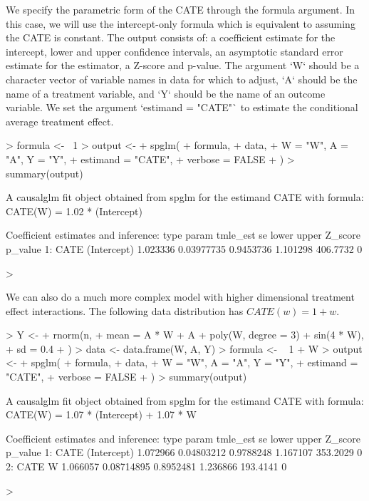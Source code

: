 \documentclass[article]{jss}
\begin{document}
We specify the parametric form of the CATE through the formula argument. In this case, we will use the intercept-only formula which is equivalent to assuming the CATE is constant.  The output consists of:
a coefficient estimate for the intercept, lower and upper confidence intervals, an asymptotic standard error estimate for the estimator, a Z-score and p-value. The argument `W` should be a character vector of variable names in data for which to adjust, `A` should be the name of a treatment variable, and `Y` should be the name of an outcome variable. We set the argument `estimand = "CATE"` to estimate the conditional average treatment effect.
\begin{Schunk}
\begin{Sinput}
> formula <- ~1
> output <-
+   spglm(
+     formula,
+     data,
+     W = "W", A = "A", Y = "Y",
+     estimand = "CATE",
+     verbose = FALSE
+   )
> summary(output)
\end{Sinput}
\begin{Soutput}
A causalglm fit object obtained from spglm for the estimand CATE with formula: 
CATE(W) = 1.02 * (Intercept)

Coefficient estimates and inference:
   type       param tmle_est         se     lower    upper  Z_score p_value
1: CATE (Intercept) 1.023336 0.03977735 0.9453736 1.101298 406.7732       0
\end{Soutput}
\begin{Sinput}
> 
\end{Sinput}
\end{Schunk}
We can also do a much more complex model with higher dimensional treatment effect interactions. The following data distribution has $CATE(w) = 1 + w$.  
\begin{Schunk}
\begin{Sinput}
> Y <-
+   rnorm(n,
+     mean = A * W + A + poly(W, degree = 3) + sin(4 * W),
+     sd = 0.4
+   )
> data <- data.frame(W, A, Y)
> formula <- ~ 1 + W
> output <-
+   spglm(
+     formula,
+     data,
+     W = "W", A = "A", Y = "Y",
+     estimand = "CATE",
+     verbose = FALSE
+   )
> summary(output)
\end{Sinput}
\begin{Soutput}
A causalglm fit object obtained from spglm for the estimand CATE with formula: 
CATE(W) = 1.07 * (Intercept) + 1.07 * W

Coefficient estimates and inference:
   type       param tmle_est         se     lower    upper  Z_score p_value
1: CATE (Intercept) 1.072966 0.04803212 0.9788248 1.167107 353.2029       0
2: CATE           W 1.066057 0.08714895 0.8952481 1.236866 193.4141       0
\end{Soutput}
\begin{Sinput}
> 
\end{Sinput}
\end{Schunk}
\end{document}
